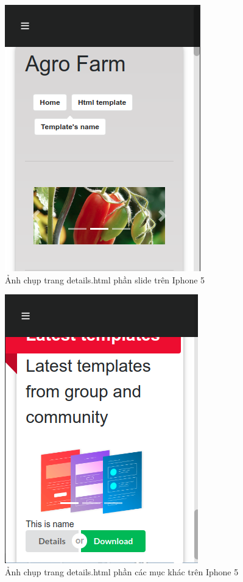\documentclass[a4paper]{article}
\begin{document}
\begin{figure}[H]
\begin{center}
\includegraphics[page=1, scale=0.5]{screenshot/iphone1.png}
\caption{Ảnh chụp trang details.html phần slide trên Iphone 5}
\end{center}
\end{figure}

\begin{figure}[H]
\begin{center}
\includegraphics[page=1, scale=0.5]{screenshot/iphone2.png}
\caption{Ảnh chụp trang details.html phần các mục khác trên Iphone 5}
\end{center}
\end{figure}
\end{document}
